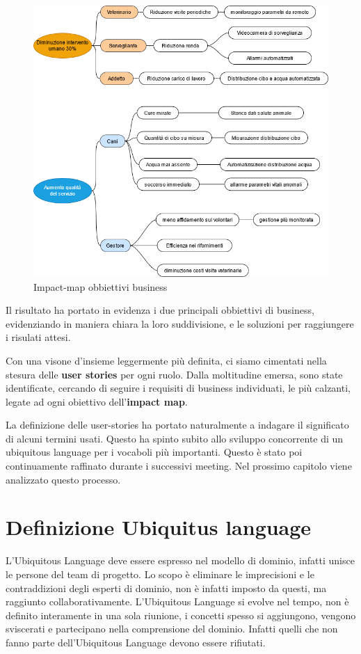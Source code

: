     \begin{figure}[ht]
        \caption{Impact-map obbiettivi business}
        \centering
        \includegraphics[width=1\textwidth]{DrawIo/impactMap.png}
    \end{figure}

    Il risultato ha portato in evidenza i due principali obbiettivi di business, evidenziando in maniera chiara la loro suddivisione, e le soluzioni per raggiungere i risulati attesi.
    
    Con una visone d'insieme leggermente più definita, ci siamo cimentati nella stesura delle \textbf{user stories} per ogni ruolo. Dalla moltitudine emersa, sono state identificate, cercando di seguire i requisiti di business individuati,  le più calzanti, legate ad ogni obiettivo dell'\textbf{impact map}.

	La definizione delle user-stories ha portato naturalmente a indagare il significato di alcuni termini usati. Questo ha spinto subito allo sviluppo concorrente di un ubiquitous language per i vocaboli più importanti. Questo è stato poi continuamente raffinato durante i successivi meeting. 
	Nel prossimo capitolo viene analizzato questo processo. 
    
	\section{Definizione Ubiquitus language}	
	L'Ubiquitous Language deve essere espresso nel modello di dominio, infatti unisce le persone del team di progetto.
    Lo scopo è eliminare le imprecisioni e le contraddizioni degli esperti di dominio, non è infatti imposto da questi, ma raggiunto collaborativamente.
    L'Ubiquitous Language si evolve nel tempo, non è definito interamente in una sola riunione, i concetti spesso si aggiungono, vengono sviscerati e partecipano nella comprensione del dominio. Infatti quelli che non fanno parte dell'Ubiquitous Language devono essere rifiutati.
    
